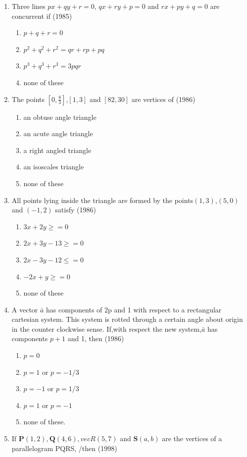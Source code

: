 \documentclass[12pt]{article}
\let\vec\mathbf
\begin{document}
\begin{enumerate}
\item Three lines $px+qy+r=0$, $qx+ry+p=0$ and $rx+py+q=0$ are concurrent if  (1985)\\
\begin{enumerate}
\item $p+q+r=0$
\item $p^2+q^2+r^2=qr+rp+pq$
\item $p^3+q^3+r^3=3pqr$
\item none of these
\end{enumerate}
\item The points $[0,\frac{8}{3}]$,$[1,3]$ and $[82,30]$ are vertices of (1986)\\
\begin{enumerate}
\item an obtuse angle triangle
\item an acute angle triangle 
\item a  right angled triangle
\item an isoscales triangle
\item none of these
\end{enumerate}
\item All points lying inside the triangle are formed by the points$(1,3)$,$(5,0)$ and $(-1,2)$ satisfy (1986)\\
\begin{enumerate}
\item $3x+2y\ge=0$
\item $2x+3y-13\ge=0$
\item $2x-3y-12\le=0$
\item $-2x+y\ge=0$
\item none of these
\end{enumerate}
\item A vector $\bar{a}$ has components of 2p and 1 with respect to a rectangular cartesian system. This system is rotted through a certain angle about origin in the counter clockwise sense. If,with respect the new system,$\bar{a}$ has components $p+1$ and 1, then (1986)\\
\begin{enumerate}
\item $p=0$  
\item $p=1$ or  $p=-1/3$  
\item $p=-1$ or $p=1/3$ 
\item $p=1$ or  $p=-1$
\item none of these.
\end{enumerate}
\item  If $\vec{P}(1,2),\vec{Q}(4,6),vec{R}(5,7)$ and $\vec{S}(a,b)$ are the vertices of a parallelogram PQRS, /then (1998)\\

\end{enumerate}
\end{document}
